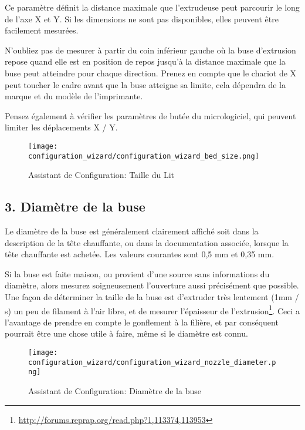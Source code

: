 Ce param\`etre d\'efinit la distance maximale que l'extrudeuse peut parcourir le long de l'axe X et Y. Si les dimensions ne sont pas disponibles, elles peuvent \^etre facilement mesur\'ees.

N'oubliez pas de mesurer \`a partir du coin inf\'erieur gauche o\`u la buse d'extrusion repose quand elle est en position de repos jusqu'\`a la distance maximale que la buse peut atteindre pour chaque direction. Prenez en compte que le chariot de X peut toucher le cadre avant que la buse atteigne sa limite, cela d\'ependra de la marque et du mod\`ele de l'imprimante.

Pensez \'egalement \`a v\'erifier les param\`etres de but\'ee du micrologiciel, qui peuvent limiter les d\'eplacements X / Y.

\begin{figure}[H]
\centering
\texttt{[image: configuration\_wizard/configuration\_wizard\_bed\_size.png]}
\caption{Assistant de Configuration: Taille du Lit}
\label{fig:configuration_wizard_bed_size}
\end{figure}

\newpage
\subsection{3. Diam\`etre de la buse}
\label{sub:3_nozzle_diameter}
Le diam\`etre de la buse est g\'en\'eralement clairement affich\'e soit dans la description de la t\^ete chauffante, ou dans la documentation associ\'ee, lorsque la t\^ete chauffante est achet\'ee. Les valeurs courantes sont 0,5 mm et 0,35 mm.

Si la buse est faite maison, ou provient d'une source sans informations du diam\`etre, alors mesurez soigneusement l'ouverture aussi pr\'ecis\'ement que possible. Une fa\c{c}on de d\'eterminer la taille de la buse est d'extruder tr\`es lentement (1mm / s) un peu de filament \`a l'air libre, et de mesurer l'\'epaisseur de l'extrusion\footnote{\url{http://forums.reprap.org/read.php?1,113374,113953}}.  
Ceci a l'avantage de prendre en compte le gonflement \`a la fili\`ere, et par cons\'equent pourrait \^etre une chose utile \`a faire, m\^eme si le diam\`etre est connu.

\begin{figure}[H]
\centering
\texttt{[image: configuration\_wizard/configuration\_wizard\_nozzle\_diameter.png]}
\caption{Assistant de Configuration: Diam\`etre de la buse}
\label{fig:configuration_wizard_nozzle_diameter}
\end{figure}

